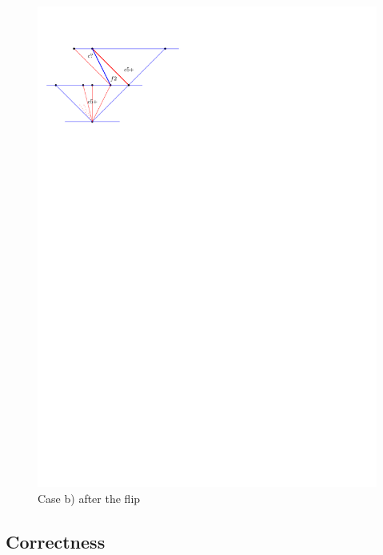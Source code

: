 \begin{figure}[h]
  \centering
  \includegraphics[scale=1]{unifiedAlgo/img/flipactionb}
  \caption{Case b) after the flip}
  \label{fig:uni:flipactionb}
\end{figure}

\subsection{Correctness}
